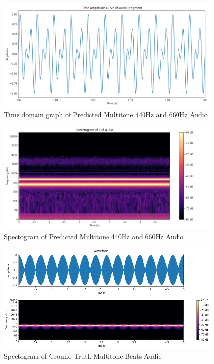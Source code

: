 \documentclass{ioereport}
\begin{document}
    \begin{figure}[H]
        \centering
        \includegraphics[width=\linewidth]{assets/audio_results/PredmultitoneA4E4time.png}
        \caption{Time domain graph of Predicted Multitone 440Hz and 660Hz Audio}
        \label{fig:pred-multitonea4e4-time}
    \end{figure}
    \begin{figure}[H]
        \centering
        \includegraphics[width=\linewidth]{assets/audio_results/PredmultitoneA4E4spec.png}
        \caption{Spectogram of Predicted Multitone 440Hz and 660Hz Audio}
        \label{fig:pred-multitoneA4E4-spec}
    \end{figure}


    \begin{figure}[H]
        \centering
        \includegraphics[width=\linewidth]{assets/audio_results/multitoneBeats.png}
        \caption{Spectogram of Ground Truth Multitone Beats Audio}
        \label{fig:gt-multibeat-spec}
    \end{figure}
    
\end{document}
